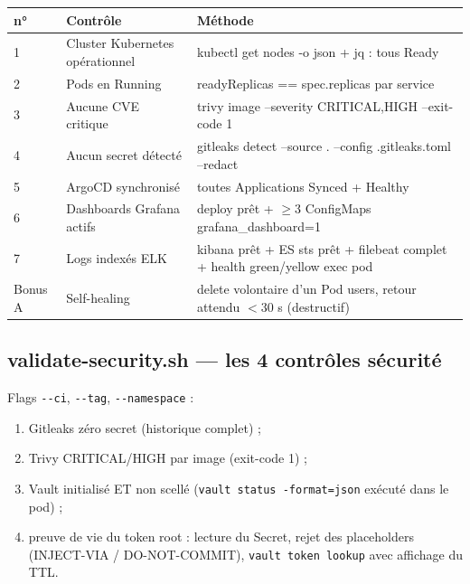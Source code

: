 \documentclass[12pt,a4paper,twoside,openright]{report}
\begin{document}
\begin{center}\label{tab:ch-scripts-de-validation-de-la-plateforme-validate-}\end{center}
\begin{longtable}{@{}p{0.8cm}p{5.6cm}p{7.6cm}@{}}
\toprule
\textbf{n°} & \textbf{Contrôle} & \textbf{Méthode} \\
\midrule
\endhead
1 & Cluster Kubernetes opérationnel & kubectl get nodes -o json + jq : tous Ready \\
2 & Pods en Running & readyReplicas == spec.replicas par service \\
3 & Aucune CVE critique & trivy image --severity CRITICAL,HIGH --exit-code 1 \\
4 & Aucun secret détecté & gitleaks detect --source . --config .gitleaks.toml --redact \\
5 & ArgoCD synchronisé & toutes Applications Synced + Healthy \\
6 & Dashboards Grafana actifs & deploy prêt + $\geq$3 ConfigMaps grafana\_dashboard=1 \\
7 & Logs indexés ELK & kibana prêt + ES sts prêt + filebeat complet + health green/yellow exec pod \\
Bonus A & Self-healing & delete volontaire d'un Pod users, retour attendu $<$30 s (destructif) \\
\bottomrule
\end{longtable}

\subsection{validate-security.sh --- les 4 contrôles sécurité}
Flags \texttt{-{}-ci}, \texttt{-{}-tag}, \texttt{-{}-namespace} :
\begin{enumerate}[itemsep=1pt]
  \item Gitleaks zéro secret (historique complet) ;
  \item Trivy CRITICAL/HIGH par image (exit-code 1) ;
  \item Vault initialisé ET non scellé (\texttt{vault status -format=json} exécuté dans le pod) ;
  \item preuve de vie du token root : lecture du Secret, rejet des placeholders (INJECT-VIA / DO-NOT-COMMIT), \texttt{vault token lookup} avec affichage du TTL.
\end{enumerate}
\end{document}
